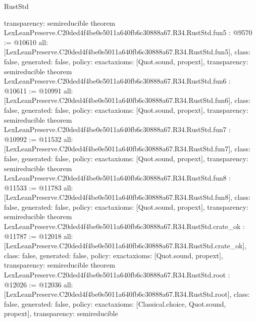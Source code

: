 \begin{lexlean}{RustStd}
\begin{coremodule}
{  transparency: semireducible
}
theorem LexLeanPreserve.C20ded4f4be0e5011a640fb6c30888a67.R34.RustStd.fun5 : @9570 := @10610 {
  all: [LexLeanPreserve.C20ded4f4be0e5011a640fb6c30888a67.R34.RustStd.fun5],
  class: false,
  generated: false,
  policy: exact{axioms: [Quot.sound, propext]},
  transparency: semireducible
}
theorem LexLeanPreserve.C20ded4f4be0e5011a640fb6c30888a67.R34.RustStd.fun6 : @10611 := @10991 {
  all: [LexLeanPreserve.C20ded4f4be0e5011a640fb6c30888a67.R34.RustStd.fun6],
  class: false,
  generated: false,
  policy: exact{axioms: [Quot.sound, propext]},
  transparency: semireducible
}
theorem LexLeanPreserve.C20ded4f4be0e5011a640fb6c30888a67.R34.RustStd.fun7 : @10992 := @11532 {
  all: [LexLeanPreserve.C20ded4f4be0e5011a640fb6c30888a67.R34.RustStd.fun7],
  class: false,
  generated: false,
  policy: exact{axioms: [Quot.sound, propext]},
  transparency: semireducible
}
theorem LexLeanPreserve.C20ded4f4be0e5011a640fb6c30888a67.R34.RustStd.fun8 : @11533 := @11783 {
  all: [LexLeanPreserve.C20ded4f4be0e5011a640fb6c30888a67.R34.RustStd.fun8],
  class: false,
  generated: false,
  policy: exact{axioms: [Quot.sound, propext]},
  transparency: semireducible
}
theorem LexLeanPreserve.C20ded4f4be0e5011a640fb6c30888a67.R34.RustStd.crate_ok : @11787 := @12018 {
  all: [LexLeanPreserve.C20ded4f4be0e5011a640fb6c30888a67.R34.RustStd.crate_ok],
  class: false,
  generated: false,
  policy: exact{axioms: [Quot.sound, propext]},
  transparency: semireducible
}
theorem LexLeanPreserve.C20ded4f4be0e5011a640fb6c30888a67.R34.RustStd.root : @12026 := @12036 {
  all: [LexLeanPreserve.C20ded4f4be0e5011a640fb6c30888a67.R34.RustStd.root],
  class: false,
  generated: false,
  policy: exact{axioms: [Classical.choice, Quot.sound, propext]},
  transparency: semireducible
}


\end{coremodule}
\end{lexlean}
